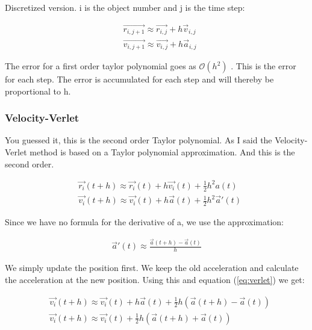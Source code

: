Discretized version. i is the object number and j is the time step:

\begin{align*}
	&\vec{r_{i,j+1}} \approx \vec{r_{i,j}} + h \vec{v}_{i,j}
	\\
	&\vec{v_{i,j+1}} \approx \vec{v_{i,j}} + h \vec{a}_{i,j}
\end{align*}

The error for a first order taylor polynomial goes as $\mathcal{O}(h^2)$ \cite{compphys}. This is the error for each step. The error is accumulated for each step and will thereby be proportional to h. 













\subsubsection{Velocity-Verlet}

You guessed it, this is the second order Taylor polynomial. As I said the Velocity-Verlet method is based on a Taylor polynomial approximation. And this is the second order. 

\begin{align}
	&\vec{r_i}(t+h) \approx \vec{r_i}(t) + h \vec{v_i}(t) + \frac{1}{2} h^2 a(t)
	\\
	&\vec{v_i}(t+h) \approx \vec{v_i}(t) + h \vec{a}(t) + \frac{1}{2} h^2 \vec{a}'(t)
	\label{eq:verlet}
\end{align}

Since we have no formula for the derivative of a, we use the approximation: 

\begin{align*}
	\vec{a}'(t) \approx \frac{\vec{a}(t+h) - \vec{a}(t)}{h}
\end{align*}

We simply update the position first. We keep the old acceleration and calculate the acceleration at the new position.  Using this and equation (\ref{eq:verlet}) we get: 

\begin{align*}
	&\vec{v_i}(t+h) \approx \vec{v_i}(t) + h \vec{a}(t) + \frac{1}{2} h(\vec{a}(t+h) - \vec{a}(t))
	\\
	&\vec{v_i}(t+h) \approx \vec{v_i}(t) + \frac{1}{2} h(\vec{a}(t+h) + \vec{a}(t))
\end{align*}

